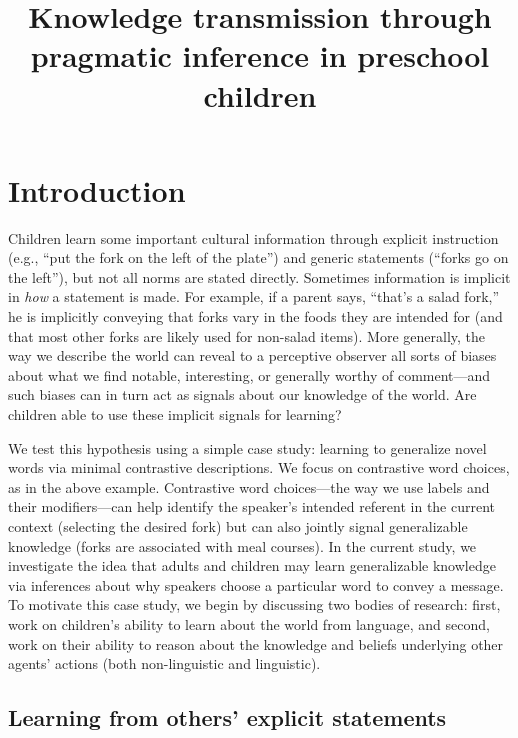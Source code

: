 \documentclass[man]{apa2}
\title{
Knowledge transmission through pragmatic inference in preschool children}
\begin{document}
\maketitle                            


\section{Introduction}

Children learn some important cultural information through explicit instruction (e.g., ``put the fork on the left of the plate'') and generic statements (``forks go on the left''), but not all norms are stated directly. Sometimes information is implicit in \emph{how} a statement is made. For example, if a parent says, ``that's a salad fork,'' he is implicitly conveying that forks vary in the foods they are intended for (and that most other forks are likely used for non-salad items). More generally, the way we describe the world can reveal to a perceptive observer all sorts of biases about what we find notable, interesting, or generally worthy of comment---and such biases can in turn act as signals about our knowledge of the world. Are children able to use these implicit signals for learning? 

We test this hypothesis using a simple case study: learning to generalize novel words via minimal contrastive descriptions.  We focus on contrastive word choices, as in the above example. Contrastive word choices---the way we use labels and their modifiers---can help identify the speaker's intended referent in the current context (selecting the desired fork) but can also jointly signal generalizable knowledge (forks are associated with meal courses). In the current study, we investigate the idea that adults and children may learn generalizable knowledge via inferences about why speakers choose a particular word to convey a message. To motivate this case study, we begin by discussing two bodies of research: first, work on children's ability to learn about the world from language, and second, work on their ability to reason about the knowledge and beliefs underlying other agents' actions (both non-linguistic and linguistic). 


\subsection{Learning from others' explicit statements}
\end{document}
